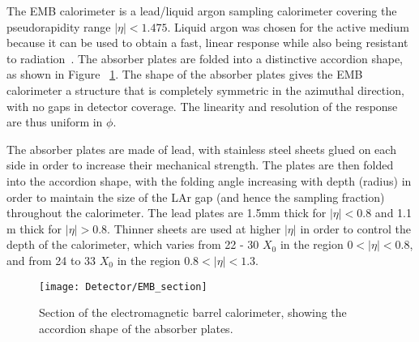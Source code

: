 The EMB calorimeter is a lead/liquid argon sampling calorimeter covering the pseudorapidity range $|\eta| < 1.475$. Liquid argon  was chosen for the active medium because it can be used to obtain a fast, linear response while also being resistant to radiation~\cite{detector_paper}. The absorber plates are folded into a distinctive accordion shape, as shown in Figure ~\ref{fig_EMB_section}. The shape of the absorber plates gives the EMB calorimeter a structure that is completely symmetric in the azimuthal direction, with no gaps in detector coverage. The linearity and resolution of the response are thus uniform in $\phi$.



The absorber plates are made of lead, with stainless steel sheets glued on each side in order to increase their mechanical strength. The plates are then folded into the accordion shape, with the folding angle increasing with depth (radius) in order to maintain the size of the LAr gap (and hence the sampling fraction) throughout the calorimeter. The lead plates are 1.5mm thick for $|\eta| < 0.8$ and 1.1 m thick for $|\eta| > 0.8$. Thinner sheets are used at higher $|\eta|$ in order to control the depth of the calorimeter\cite{TDR_LAR}, which varies from 22 - 30 $X_0$ in the region $0 < |\eta|<0.8$, and from 24 to 33 $X_0$ in the region $0.8 < |\eta|<1.3$. 

% 
%
%
%

\begin{figure}[tb]
\begin{center}
\texttt{[image: Detector/EMB\_section]}
\end{center}
\caption[Section of the EMB calorimeter]{Section of the electromagnetic barrel calorimeter, showing the accordion shape of the absorber plates.}
\label{fig_EMB_section}
\end{figure}

